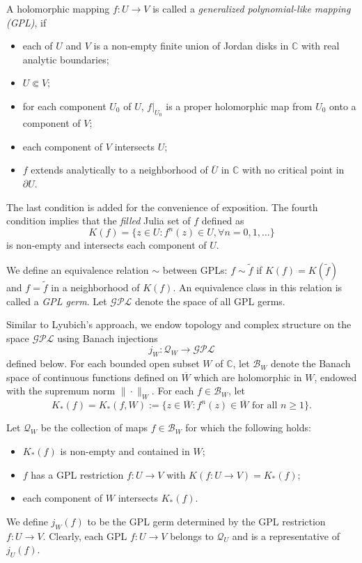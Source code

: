 \documentclass{amsart}
\numberwithin{equation}{section}
\newcommand{\C}{\mathbb C}
\theoremstyle{definition}
\theoremstyle{remark}
\begin{document}
A holomorphic mapping $f:U\to V$ is called a {\em generalized polynomial-like mapping (GPL)}, if 
\begin{itemize}
\item each of $U$ and $V$ is a non-empty finite union of Jordan disks in $\mathbb{C}$ with real analytic boundaries; 
\item $U\Subset V$;
\item for each component $U_0$ of $U$, $f|_{U_0}$ is a proper holomorphic map from $U_0$ onto a component of $V$;
\item each component of $V$ intersects $U$;
\item $f$ extends analytically to a neighborhood of $\overline{U}$ in $\C$ with no critical point in $\partial U$.
\end{itemize} 
The last condition is added for the convenience of exposition. 
The fourth condition implies that the {\em filled} Julia set of $f$ defined as 
\begin{equation}\label{eqn:Kf}
K(f)=\{z\in U: f^n(z)\in U, \forall n=0,1,\ldots\}
\end{equation}
is non-empty and intersects each component of $U$. 

We define an equivalence relation $\sim$ between GPLs: $f\sim \widetilde{f}$ if $K(f)=K(\widetilde{f})$ and $f=\widetilde{f}$ in a neighborhood of $K(f)$. 
An equivalence class in this relation is called a {\em GPL germ}. 
Let $\mathcal{GPL}$ denote the space of all GPL germs.



Similar to Lyubich's approach, we endow topology and complex structure on the space $\mathcal{GPL}$ using Banach injections 
\begin{equation}\label{eqn:jw}
j_W:\mathcal{Q}_W\to \mathcal{GPL}
\end{equation} 
defined below. 
For each bounded open subset $W$ of $\mathbb{C}$, let $\mathcal{B}_W$ denote the Banach space of continuous functions defined on $\overline{W}$ which are holomorphic in $W$, endowed with the supremum norm $\|\cdot\|_W$. For each $f\in \mathcal{B}_W$, let 
\begin{equation}\label{eqn:K*fW}
K_*(f)=K_*(f,W):=\{z\in \overline{W}: f^n(z)\in \overline{W}\text{ for all } n\ge 1\}. 
\end{equation}

Let $\mathcal{Q}_W$ be the collection of maps $f\in \mathcal{B}_W$ for which the following holds:
\begin{itemize}
\item $K_*(f)$ is non-empty and contained in $W$;
\item $f$ has a GPL restriction $f:U\to V$ with $K(f:U\to V)=K_*(f)$;
\item each component of $W$ intersects $K_*(f)$.
\end{itemize}
We define $j_W(f)$ to be the GPL germ determined by the GPL restriction $f:U\to V$. 
Clearly, each GPL $f:U\to V$ belongs to $\mathcal{Q}_U$ and is a representative of $j_U(f)$. 
\end{document}
